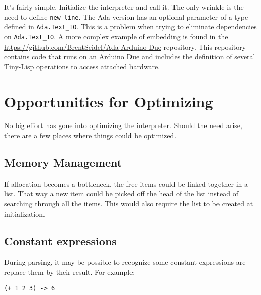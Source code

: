\documentclass[10pt, openany]{book}
\newcommand{\package}[1]{\texttt{#1}}
\newcommand{\function}[1]{\texttt{#1}}
\newcommand{\tl}{Tiny-Lisp}
\begin{document}
It's fairly simple.  Initialize the interpreter and call it.  The only wrinkle is the need to define \function{new\_line}.  The Ada version has an optional parameter of a type defined in \package{Ada.Text\_IO}.  This is a problem when trying to eliminate dependencies on \package{Ada.Text\_IO}.  A more complex example of embedding is found in the \url{https://github.com/BrentSeidel/Ada-Arduino-Due} repository.  This repository contains code that runs on an Arduino Due and includes the definition of several \tl{} operations to access attached hardware.


\section{Opportunities for Optimizing}
No big effort has gone into optimizing the interpreter.  Should the need arise, there are a few places where things could be optimized.

\subsection{Memory Management}
If allocation becomes a bottleneck, the free items could be linked together in a list.  That way a new item could be picked off the head of the list instead of searching through all the items.  This would also require the list to be created at initialization.

\subsection{Constant expressions}
During parsing, it may be possible to recognize some constant expressions are replace them by their result.  For example:
\lstset{language=[Tiny]Lisp}
\begin{lstlisting}
(+ 1 2 3) -> 6
\end{lstlisting}
\end{document}
